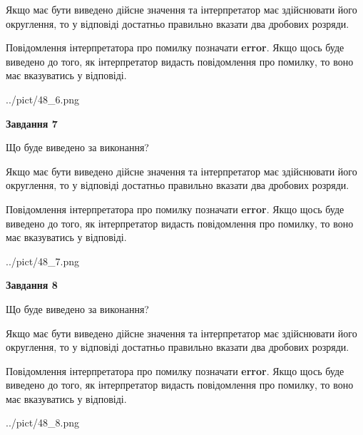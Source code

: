 \documentclass[12pt, ukrainian]{article}
\begin{document}
{\begin {Large}
Якщо має бути виведено дійсне значення та інтерпретатор має здійснювати його округлення, 
то у відповіді достатньо правильно вказати два дробових розряди.

Повідомлення інтерпретатора про помилку позначати \textbf{error}.
Якщо щось буде виведено до того, як інтерпретатор видасть повідомлення про помилку, 
то воно має вказуватись у відповіді. \par

\begin{center}
	{../pict/48_6.png}
\end{center}
\newpage

{\begin {center}\textbf{Завдання 7}\end {center}}\par
Що буде виведено за виконання? \par

Якщо має бути виведено дійсне значення та інтерпретатор має здійснювати його округлення, 
то у відповіді достатньо правильно вказати два дробових розряди.

Повідомлення інтерпретатора про помилку позначати \textbf{error}.
Якщо щось буде виведено до того, як інтерпретатор видасть повідомлення про помилку, 
то воно має вказуватись у відповіді. \par

\begin{center}
	{../pict/48_7.png}
\end{center}
\newpage

{\begin {center}\textbf{Завдання 8}\end {center}}\par
Що буде виведено за виконання? \par

Якщо має бути виведено дійсне значення та інтерпретатор має здійснювати його округлення, 
то у відповіді достатньо правильно вказати два дробових розряди.

Повідомлення інтерпретатора про помилку позначати \textbf{error}.
Якщо щось буде виведено до того, як інтерпретатор видасть повідомлення про помилку, 
то воно має вказуватись у відповіді. \par

\begin{center}
	{../pict/48_8.png}
\end{center}
\newpage


\end{Large}}
\end{document}
